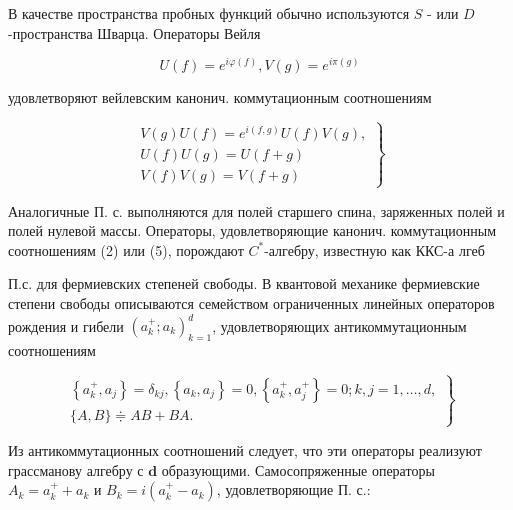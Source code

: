 \documentclass[10pt]{article}
\begin{document}
В качестве пространства пробных функций обычно используются $S$ - или $D$-пространства Шварца. Операторы Вейля



\[

U(f)=e^{i \varphi(f)}, V(g)=e^{i \pi(g)}

\]



удовлетворяют вейлевским канонич. коммутационным соотношениям



\[

\left.\begin{array}{c}

V(g) U(f)=e^{i(f, g)} U(f) V(g), \\

U(f) U(g)=U(f+g) \\

V(f) V(g)=V(f+g)

\end{array}\right\}

\]



Аналогичные П. с. выполняются для полей старшего спина, заряженных полей и полей нулевой массы. Операторы, удовлетворяющие канонич. коммутационным соотношениям (2) или (5), порождают $C^{*}$-алгебру, известную как ККС-а лгеб



П.с. для фермиевских степеней свободы. В квантовой механике фермиевские степени свободы описываются семейством ограниченных линейных операторов рождения и гибели $\left(a_{k}^{+} ; a_{k}\right)_{k=1}^{d}$, удовлетворяющих антикоммутационным соотношениям



\[

\left.\begin{array}{c}

\left\{a_{k}^{+}, a_{j}\right\}=\delta_{k j},\left\{a_{k}, a_{j}\right\}=0,\left\{a_{k}^{+}, a_{j}^{+}\right\}=0 ; k, j=1, \ldots, d, \\

\{A, B\} \doteqdot A B+B A .

\end{array}\right\}

\]



Из антикоммутационных соотношений следует, что эти операторы реализуют грассманову алгебру с $\boldsymbol{d}$ образующими. Самосопряженные операторы $A_{k}=a_{k}^{+}+a_{k}$ и $B_{k}=i\left(a_{k}^{+}-a_{k}\right)$, удовлетворяющие П. с.:
\end{document}
